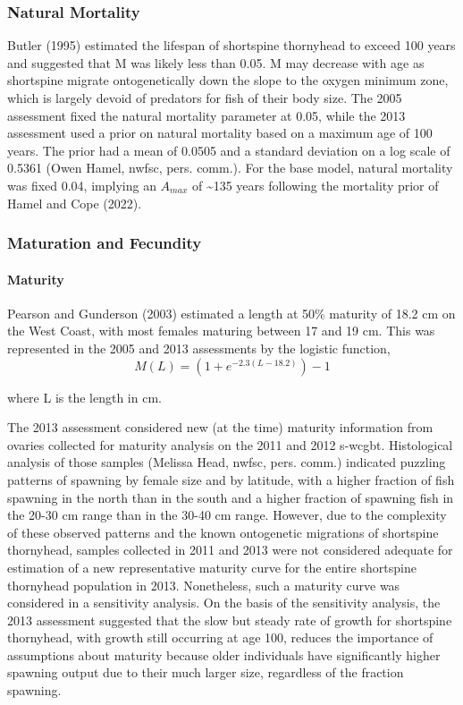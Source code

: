 \documentclass[11pt,
  english,
  letterpaper,
]{article}
\begin{document}
\hypertarget{natural-mortality}{%
\subsubsection{Natural Mortality}\label{natural-mortality}}

Butler (1995) estimated the lifespan of shortspine thornyhead to exceed 100 years and suggested that M was likely less than 0.05. M may decrease with age as shortspine migrate ontogenetically down the slope to the oxygen minimum zone, which is largely devoid of predators for fish of their body size. The 2005 assessment fixed the natural mortality parameter at 0.05, while the 2013 assessment used a prior on natural mortality based on a maximum age of 100 years. The prior had a mean of 0.0505 and a standard deviation on a log scale of 0.5361 (Owen Hamel, \gls{nwfsc}, pers. comm.). For the base model, natural mortality was fixed 0.04, implying an \(A_{max}\) of \textasciitilde135 years following the mortality prior of Hamel and Cope (2022).

\hypertarget{maturation-and-fecundity}{%
\subsubsection{Maturation and Fecundity}\label{maturation-and-fecundity}}

\hypertarget{maturity}{%
\paragraph{Maturity}\label{maturity}}

Pearson and Gunderson (2003) estimated a length at 50\% maturity of 18.2 cm on the West Coast, with most females maturing between 17 and 19 cm. This was represented in the 2005 and 2013 assessments by the logistic function, \begin{equation} M(L) = (1 + e^{-2.3(L-18.2)})-1\end{equation}

where L is the length in cm.

The 2013 assessment considered new (at the time) maturity information from ovaries collected for maturity analysis on the 2011 and 2012 \gls{s-wcgbt}. Histological analysis of those samples (Melissa Head, \gls{nwfsc}, pers. comm.) indicated puzzling patterns of spawning by female size and by latitude, with a higher fraction of fish spawning in the north than in the south and a higher fraction of spawning fish in the 20-30 cm range than in the 30-40 cm range. However, due to the complexity of these observed patterns and the known ontogenetic migrations of shortspine thornyhead, samples collected in 2011 and 2013 were not considered adequate for estimation of a new representative maturity curve for the entire shortspine thornyhead population in 2013. Nonetheless, such a maturity curve was considered in a sensitivity analysis. On the basis of the sensitivity analysis, the 2013 assessment suggested that the slow but steady rate of growth for shortspine thornyhead, with growth still occurring at age 100, reduces the importance of assumptions about maturity because older individuals have significantly higher spawning output due to their much larger size, regardless of the fraction spawning.
\end{document}
